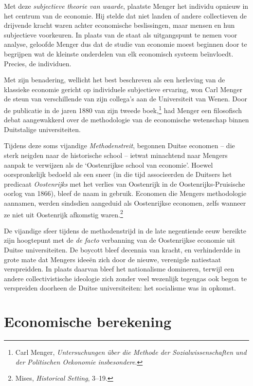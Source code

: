 \documentclass[
  a5paper,
  smalldemyvopaper,11pt,twoside,onecolumn,openright,extrafontsizes,
hidelinks]{memoir}
\begin{document}
Met deze \emph{subjectieve theorie van waarde}, plaatste Menger het
individu opnieuw in het centrum van de economie. Hij stelde dat niet
landen of andere collectieven de drijvende kracht waren achter
economische beslissingen, maar mensen en hun subjectieve voorkeuren. In
plaats van de staat als uitgangspunt te nemen voor analyse, geloofde
Menger dus dat de studie van economie moest beginnen door te begrijpen
wat de kleinste onderdelen van elk economisch systeem beïnvloedt.
Precies, de individuen.

Met zijn benadering, wellicht het best beschreven als een herleving van
de klassieke economie gericht op individuele subjectieve ervaring, won
Carl Menger de steun van verschillende van zijn collega's aan de
Universiteit van Wenen. Door de publicatie in de jaren 1880 van zijn
tweede boek,\footnote{\hspace{0pt}Carl Menger, \emph{Untersuchungen über
  die Methode der Sozialwissenschaften und der Politischen Oekonomie
  insbesondere}.} had Menger een filosofisch debat aangewakkerd over de
methodologie van de economische wetenschap binnen Duitstalige
universiteiten.

Tijdens deze soms vijandige \emph{Methodenstreit}, begonnen Duitse
economen -- die sterk neigden naar de historische school -- ietwat
minachtend naar Mengers aanpak te verwijzen als de `Oostenrijkse school
van economie'. Hoewel oorspronkelijk bedoeld als een sneer (in die tijd
associeerden de Duitsers het predicaat \emph{Oostenrijks} met het
verlies van Oostenrijk in de Oostenrijks-Pruisische oorlog van 1866),
bleef de naam in gebruik. Economen die Mengers methodologie aannamen,
werden sindsdien aangeduid als Oostenrijkse economen, zelfs wanneer ze
niet uit Oostenrijk afkomstig waren.\footnote{\hspace{0pt}Mises,
  \emph{Historical Setting}, 3--19.}

De vijandige sfeer tijdens de methodenstrijd in de late negentiende eeuw
bereikte zijn hoogtepunt met de \emph{de facto} verbanning van de
Oostenrijkse economie uit Duitse universiteiten. De boycott bleef
decennia van kracht, en verhinderdde in grote mate dat Mengers ideeën
zich door de nieuwe, verenigde natiestaat verspreidden. In plaats
daarvan bleef het nationalisme domineren, terwijl een andere
collectivistische ideologie zich zonder veel wezenlijk tegengas ook
begon te verspreiden doorheen de Duitse universiteiten: het socialisme
was in opkomst.

\section{Economische berekening}\label{economische-berekening}
\end{document}
